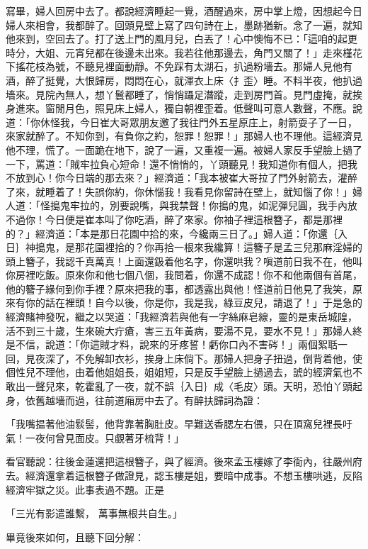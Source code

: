 \begin{showcontents}{}
寫畢，婦人回房中去了。都說經濟睡起一覺，酒醒過來，房中掌上燈，因想起今日婦人來相會，我都醉了。回頭見壁上寫了四句詩在上，墨跡猶新。念了一遍，就知他來到，空回去了。打了送上門的風月兒，白丟了！心中懊悔不已：「這咱的起更時分，大姐、元宵兒都在後邊未出來。我若往他那邊去，角門又關了！」走來槿花下搖花枝為號，不聽見裡面動靜。不免踩有太湖石，扒過粉墻去。那婦人見他有酒，醉了挺覺，大恨歸房，悶悶在心，就渾衣上床〈扌歪〉睡。不料半夜，他扒過墻來。見院內無人，想丫鬟都睡了，悄悄躡足潛蹤，走到房門首。見門虛掩，就挨身進來。窗閒月色，照見床上婦人，獨自朝裡歪着。低聲叫可意人數聲，不應。說道：「你休怪我，今日崔大哥眾朋友邀了我往門外五星原庄上，射箭耍子了一日，來家就醉了。不知你到，有負你之約，恕罪！恕罪！」那婦人也不理他。這經濟見他不理，慌了。一面跪在地下，說了一遍，又重複一遍。被婦人家反手望臉上撾了一下，罵道：「賊牢拉負心短命！還不悄悄的，丫頭聽見！我知道你有個人，把我不放到心！你今日端的那去來？」經濟道：「我本被崔大哥拉了門外射箭去，灌醉了來，就睡着了！失誤你約，你休惱我！我看見你留詩在壁上，就知惱了你！」婦人道：「怪搗鬼牢拉的，別要說嘴，與我禁聲！你搗的鬼，如泥彈兒圓，我手內放不過你！今日便是崔本叫了你吃酒，醉了來家。你袖子裡這根簪子，都是那裡的？」經濟道：「本是那日花園中拾的來，今纔兩三日了。」婦人道：「你還｛入日｝神搗鬼，是那花園裡拾的？你再拾一根來我纔算！這簪子是孟三兒那麻淫婦的頭上簪子，我認千真萬真！上面還鈒着他名字，你還哄我？嗔道前日我不在，他叫你房裡吃飯。原來你和他七個八個，我問着，你還不成認！你不和他兩個有首尾，他的簪子緣何到你手裡？原來把我的事，都透露出與他！怪道前日他見了我笑，原來有你的話在裡頭！自今以後，你是你，我是我，綠豆皮兒，請退了！」于是急的經濟賭神發呪，繼之以哭道：「我經濟若與他有一字絲麻皂線，靈的是東岳城隍，活不到三十歲，生來碗大疔瘡，害三五年黃病，要湯不見，要水不見！」那婦人終是不信，說道：「你這賊才料，說來的牙疼誓！虧你口內不害硶！」兩個絮聒一回，見夜深了，不免解卸衣衫，挨身上床倘下。那婦人把身子扭過，倒背着他，使個性兒不理他，由着他姐姐長，姐姐短，只是反手望臉上撾過去，諕的經濟氣也不敢出一聲兒來，乾霍亂了一夜，就不誤｛入日｝成〈毛皮〉頭。天明，恐怕丫頭起身，依舊越墻而過，往前道廂房中去了。有醉扶歸詞為證：

「我嘴揾著他油䯼髻，他背靠著胸肚皮。早難送香腮左右偎，只在頂窩兒裡長吁氣！一夜何曾見面皮。只覷著牙梳背！」

看官聽說：往後金蓮還把這根簪子，與了經濟。後來孟玉樓嫁了李衙內，往嚴州府去。經濟還拿着這根簪子做證見，認玉樓是姐，要暗中成事。不想玉樓哄逃，反陷經濟牢獄之災。此事表過不題。正是

「三光有影遣誰繫，  萬事無根共自生。」

畢竟後來如何，且聽下回分解：





\end{showcontents}


